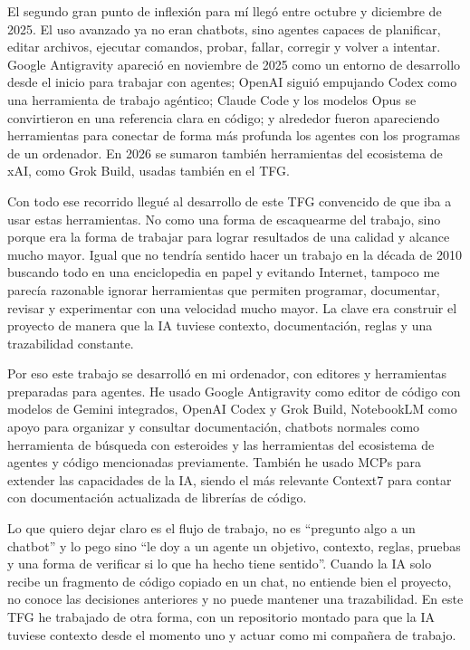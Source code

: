 El segundo gran punto de inflexión para mí llegó entre octubre y diciembre
de 2025. El uso avanzado ya no eran chatbots, sino agentes capaces de
planificar, editar archivos, ejecutar comandos, probar, fallar, corregir y
volver a intentar. Google Antigravity apareció en noviembre de 2025 como un
entorno de desarrollo desde el inicio para trabajar con agentes; OpenAI
siguió empujando Codex como una herramienta de trabajo agéntico; Claude
Code y los modelos Opus se convirtieron en una referencia clara en código;
y alrededor fueron apareciendo herramientas para conectar de forma más profunda
los agentes con los programas de un ordenador. En 2026 se sumaron también
herramientas del ecosistema de xAI, como Grok Build, usadas también en el TFG.

Con todo ese recorrido llegué al desarrollo de este TFG convencido de que iba a
usar estas herramientas. No como una forma de escaquearme del trabajo, sino porque
era la forma de trabajar para lograr resultados de una calidad y alcance mucho mayor.
Igual que no tendría sentido hacer un trabajo en la década de 2010 buscando todo en una
enciclopedia en papel y evitando Internet, tampoco me parecía razonable ignorar
herramientas que permiten programar, documentar, revisar y experimentar con una
velocidad mucho mayor. La clave era construir el proyecto de manera que la IA tuviese
contexto, documentación, reglas y una trazabilidad constante.

Por eso este trabajo se desarrolló en mi ordenador, con editores y
herramientas preparadas para agentes. He usado Google Antigravity como
editor de código con modelos de Gemini integrados, OpenAI Codex y Grok
Build, NotebookLM como apoyo para organizar y consultar documentación,
chatbots normales como herramienta de búsqueda con esteroides y las
herramientas del ecosistema de agentes y código mencionadas previamente.
También he usado MCPs para extender las capacidades de la IA, siendo el
más relevante Context7 para contar con documentación actualizada de librerías de código.

Lo que quiero dejar claro es el flujo de trabajo, no es ``pregunto algo a un chatbot''
y lo pego sino ``le doy a un agente un objetivo, contexto, reglas, pruebas y una forma
de verificar si lo que ha hecho tiene sentido''. Cuando la IA solo recibe un
fragmento de código copiado en un chat, no entiende bien el proyecto, no conoce
las decisiones anteriores y no puede mantener una trazabilidad. En este
TFG he trabajado de otra forma, con un repositorio montado para que la IA tuviese
contexto desde el momento uno y actuar como mi compañera de trabajo.

